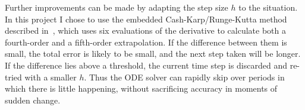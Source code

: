 Further improvements can be made by adapting the step size $h$ to the situation. In this project
I chose to use the embedded Cash-Karp/Runge-Kutta method described in~\cite{NRinC}, which uses
six evaluations of the derivative to calculate both a fourth-order and a fifth-order
extrapolation. If the difference between them is small, the total error is likely to be small,
and the next step taken will be longer. If the difference lies above a threshold, the current
time step is discarded and re-tried with a smaller $h$. Thus the ODE solver can rapidly skip over
periods in which there is little happening, without sacrificing accuracy in moments of sudden
change.
